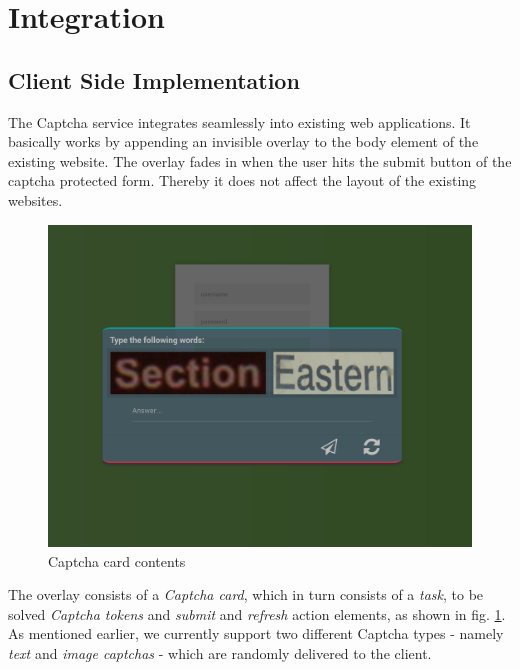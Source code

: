 \section{Integration}
\label{sec:integration}

\subsection{Client Side Implementation}
\label{subsec:Client Side Implementation}
The Captcha service integrates seamlessly into existing web applications. It basically works by appending an invisible overlay to the body element of the existing website. The overlay fades in when the user hits the submit button of the captcha protected form. Thereby it does not affect the layout of the existing websites.
\begin{figure}[H]
	\centering
	\includegraphics[width=0.8\linewidth]{content/figures/captcha_words.png}
	\caption{Captcha card contents}
	\label{fig:captcha_words}
\end{figure}

 The overlay consists of a \textit{Captcha card}, which in turn consists of a \textit{task}, to be solved \textit{Captcha tokens} and \textit{submit} and \textit{refresh} action elements, as shown in fig. \ref{fig:captcha_words}. As mentioned earlier, we currently support two different Captcha types - namely \textit{text} and \textit{image captchas} - which are randomly delivered to the client. 
 
